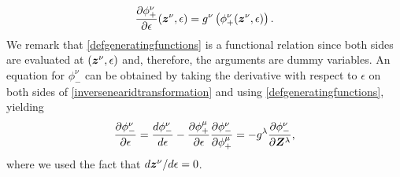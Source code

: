 %
\begin{equation} \label{defgeneratingfunctions}
\frac{\partial \phi_+^\nu}{\partial \epsilon}(\bm{z}^\nu, \epsilon) = g^\nu\left(\phi_+^\nu(\bm{z}^\nu, \epsilon)\right).
\end{equation}
%
We remark that \cref{defgeneratingfunctions} is a functional relation since both sides are evaluated at $(\bm{z}^\nu, \epsilon)$ and, therefore, the arguments are dummy variables. An equation for $\phi_-^\nu$ can be obtained by taking the derivative with respect to $\epsilon$ on both sides of \cref{inversenearidtransformation} and using \cref{defgeneratingfunctions}, yielding
%
\begin{equation} \label{defgeneratingfunctionsinverse}
    \frac{\partial \phi_{-}^\nu}{\partial \epsilon}=\frac{d \phi_{-}^\nu}{d\epsilon}-\frac{\partial \phi_+^\mu}{\partial \epsilon}\frac{\partial \phi_-^\nu}{\partial \phi_+^\mu}=- g^\lambda \frac{\partial \phi^\nu_-}{\partial  \bm{Z}^\lambda},
\end{equation}
%
where we used the fact that $d  \bm{z}^\nu / d \epsilon =0$.

